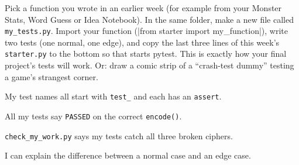 \begin{creative}
Pick a function you wrote in an earlier week (for example from your Monster Stats, Word Guess or Idea Notebook).
In the same folder, make a new file called \texttt{my\_tests.py}. Import your function (\py|from starter import my_function|), write two tests
(one normal, one edge), and copy the last three lines of this week's \texttt{starter.py} to the bottom so that  starts pytest.
This is exactly how your final project's tests will work.
Or: draw a comic strip of a \enquote{crash-test dummy} testing a game's strangest corner.
\end{creative}

\begin{selfcheck}
  \item My test names all start with \texttt{test\_} and each has an \texttt{assert}.
  \item All my tests say \texttt{PASSED} on the correct \texttt{encode()}.
  \item \texttt{check\_my\_work.py} says my tests catch all three broken ciphers.
  \item I can explain the difference between a normal case and an edge case.
\end{selfcheck}
